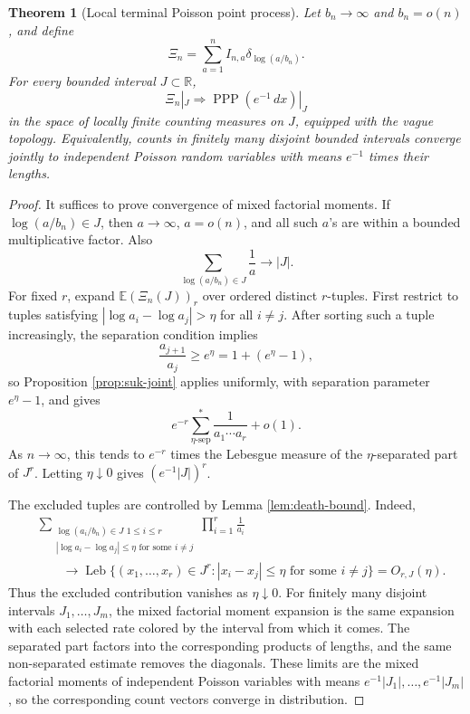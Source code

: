 \documentclass[11pt]{article}
\newtheorem{theorem}{Theorem}[section]
\theoremstyle{remark}
\newcommand{\Ee}{\mathbb E}
\newcommand{\PPP}{\operatorname{PPP}}
\newcommand{\dd}{\,d}
\begin{document}
\begin{theorem}[Local terminal Poisson point process]\label{thm:suk-ppp}
Let \(b_n\to\infty\) and \(b_n=o(n)\), and define
\[
        \Xi_n=\sum_{a=1}^n I_{n,a}\delta_{\log(a/b_n)}.
\]
For every bounded interval \(J\subset\mathbb R\),
\[
        \Xi_n|_J\Rightarrow \PPP(e^{-1}\dd x)|_J
\]
in the space of locally finite counting measures on \(J\), equipped with the
vague topology.  Equivalently, counts in finitely many disjoint bounded
intervals converge jointly to independent Poisson random variables with means
\(e^{-1}\) times their lengths.
\end{theorem}
\begin{proof}
It suffices to prove convergence of mixed factorial moments.  If \(\log(a/b_n)\in J\), then \(a\to\infty\), \(a=o(n)\), and all such \(a\)'s are within a bounded multiplicative factor.  Also
\[
        \sum_{\log(a/b_n)\in J}\frac1a\to |J|.
\]
For fixed \(r\), expand \(\Ee(\Xi_n(J))_r\) over ordered distinct \(r\)-tuples.  First restrict to tuples satisfying \(|\log a_i-\log a_j|>\eta\) for all \(i\ne j\).  After sorting such a tuple increasingly, the separation condition implies
\[
        \frac{a_{j+1}}{a_j}\ge e^\eta=1+(e^\eta-1),
\]
so Proposition \ref{prop:suk-joint} applies uniformly, with separation parameter \(e^\eta-1\), and gives
\[
        e^{-r}\sum_{\eta\text{-sep}}^*\frac1{a_1\cdots a_r}+o(1).
\]
As \(n\to\infty\), this tends to \(e^{-r}\) times the Lebesgue measure of the \(\eta\)-separated part of \(J^r\).  Letting \(\eta\downarrow0\) gives \((e^{-1}|J|)^r\).

The excluded tuples are controlled by Lemma \ref{lem:death-bound}.  Indeed,
\[
\begin{aligned}
&\sum_{\substack{\log(a_i/b_n)\in J\,\,1\le i\le r\\
        |\log a_i-\log a_j|\le\eta\text{ for some }i\ne j}}
        \prod_{i=1}^r\frac1{a_i} \\
&\qquad\longrightarrow
        \operatorname{Leb}\{(x_1,\ldots,x_r)\in J^r:
        |x_i-x_j|\le\eta\text{ for some }i\ne j\}
        =O_{r,J}(\eta).
\end{aligned}
\]
Thus the excluded contribution vanishes as \(\eta\downarrow0\).  For finitely many disjoint intervals \(J_1,\ldots,J_m\), the mixed factorial moment expansion is the same expansion with each selected rate colored by the interval from which it comes.  The separated part factors into the corresponding products of lengths, and the same non-separated estimate removes the diagonals.  These limits are the mixed factorial moments of independent Poisson variables
with means \(e^{-1}|J_1|,\ldots,e^{-1}|J_m|\), so the corresponding count
vectors converge in distribution.


\end{proof}
\end{document}

